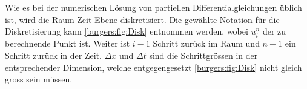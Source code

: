      Wie es bei der numerischen L\"osung von partiellen Differentialgleichungen \"ublich ist, wird die Raum-Zeit-Ebene  diskretisiert.
     Die gew\"ahlte Notation f\"ur die Diskretisierung kann \autoref{burgers:fig:Disk} entnommen werden, wobei $u_i^n$ der zu berechnende Punkt ist.
     Weiter ist $i-1$ Schritt zur\"uck im Raum und $n-1$ ein Schritt zur\"uck in der Zeit.
     $\Delta x$ und $\Delta t$ sind die Schrittgr\"ossen in der entsprechender Dimension, welche entgegengesetzt \autoref{burgers:fig:Disk} nicht gleich gross sein m\"ussen.
